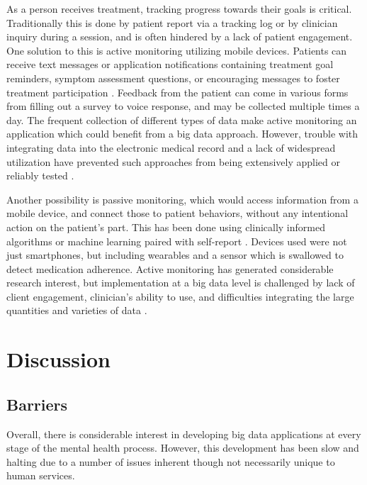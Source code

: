 \documentclass[sigconf]{acmart}
\begin{document}
As a person receives treatment, tracking progress towards their goals is critical. Traditionally this is done by patient report via a tracking log or by clinician inquiry during a session, and is often hindered by a lack of patient engagement. One solution to this is active monitoring utilizing mobile devices. Patients can receive text messages or application notifications containing treatment goal reminders, symptom assessment questions, or encouraging messages to foster treatment participation \cite{bitreview}. Feedback from the patient can come in various forms from filling out a survey  to voice response, and may be collected multiple times a day. The frequent collection of different types of data make active monitoring an application which could benefit from a big data approach. However, trouble with integrating data into the electronic medical record and a lack of widespread utilization have prevented such approaches from being extensively applied or reliably tested \cite{bigdatabipolar}.

Another possibility is passive monitoring, which would access information from a mobile device, and connect those to patient behaviors, without any intentional action on the patient's part. This has been done using clinically informed algorithms or machine learning paired with self-report \cite{bitreview}. Devices used were not just smartphones, but including wearables and a sensor which is swallowed to detect medication adherence. Active monitoring has generated considerable research interest, but implementation at a big data level is challenged by lack of client engagement, clinician's ability to use, and difficulties integrating the large quantities and varieties of data \cite{bigdatabipolar}. 

\section{Discussion}

\subsection{Barriers}

Overall, there is considerable interest in developing big data applications at every stage of the mental health process. However, this development has been slow and halting due to a number of issues inherent though not necessarily unique to human services. 
\end{document}

